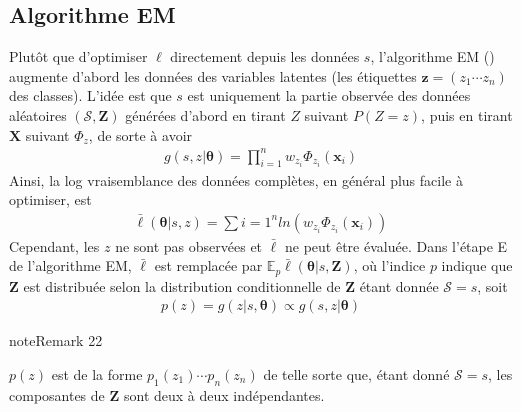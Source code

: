 \documentclass[letterpaper,10pt,french]{sphinxmanual}
\begin{document}
\subsection{Algorithme EM}
\label{\detokenize{clustering:algorithme-em}}
\sphinxAtStartPar
Plutôt que d’optimiser \(\ell\) directement depuis les données \(s\), l’algorithme EM ({\hyperref[\detokenize{clustering:EM}]{}}) augmente d’abord les données des variables latentes (les étiquettes \(\mathbf z=(z_1\cdots z_n)\) des classes). L’idée est que \(s\) est uniquement la partie observée des données aléatoires \((\mathcal S,\mathbf Z)\) générées d’abord en tirant \(Z\) suivant \(P(Z=z)\), puis en tirant \(\mathbf X\) suivant \(\Phi_z\), de sorte à avoir
\begin{equation*}
\begin{split}g(s,z|\boldsymbol \theta) = \displaystyle\prod_{i=1}^n w_{z_i} \Phi_{z_i}(\mathbf x_i)\end{split}
\end{equation*}
\sphinxAtStartPar
Ainsi, la log vraisemblance des données complètes, en général plus facile à optimiser, est
\begin{equation*}
\begin{split}\bar\ell(\boldsymbol\theta|s,z) =\displaystyle\sum{i=1}^n ln(w_{z_i} \Phi_{z_i}(\mathbf x_i))\end{split}
\end{equation*}
\sphinxAtStartPar
Cependant, les \(z\) ne sont pas observées et \(\bar\ell\) ne peut être évaluée. Dans l’étape E de l’algorithme EM, \(\bar\ell\) est remplacée par \(\mathbb{E}_p \bar\ell(\boldsymbol \theta |s,\mathbf Z)\), où l’indice \(p\) indique que \(\mathbf Z\) est distribuée selon la distribution conditionnelle de \(\mathbf Z\) étant donnée \(\mathcal S=s\), soit
\begin{equation*}
\begin{split}p(z)=g(z|s,\boldsymbol \theta) \propto g(s,z|\boldsymbol \theta)\end{split}
\end{equation*}\label{clustering:remark-7}
\begin{sphinxadmonition}{note}{Remark 22}



\sphinxAtStartPar
\(p(z)\) est de la forme \(p_1(z_1)\cdots p_n(z_n)\) de telle sorte que, étant donné \(\mathcal S=s\), les composantes de \(\mathbf Z\) sont deux à deux indépendantes.
\end{sphinxadmonition}
\label{clustering:EM}
\end{document}
